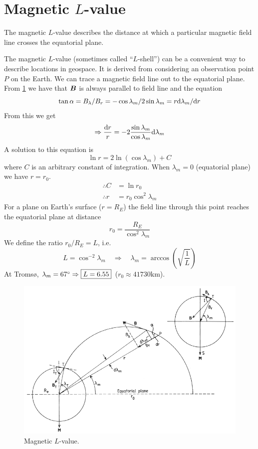 \section{Magnetic \(L\)-value}
\begin{definition}\label{def:mag_L_value}
    The magnetic \(L\)-value describes the distance at which a particular magnetic field line crosses the equatorial plane.
\end{definition}
\noindent The magnetic \(L\)-value (sometimes called ``\(L\)-shell'') can be a convenient way to describe locations in geospace. It is derived from considering an observation point \(P\) on the Earth. We can trace a magnetic field line out to the equatorial plane. From \cref{fig:magnetic_L_value} we have that \(\boldsymbol{B}\) is always parallel to field line and the equation
\begin{equation*}
    \tan\alpha=B_\lambda/B_r=-\cos\lambda_m/2\sin\lambda_m=r\textnormal{d}\lambda_m/\textnormal{d}r
\end{equation*}
From this we get
\begin{equation*}
    \Rightarrow \frac{\textnormal{d}r}{r}=-2\frac{\sin\lambda_m}{\cos\lambda_m}\textnormal{d}\lambda_m
\end{equation*}
A solution to this equation is
\begin{equation*}
    \ln r=2\ln(\cos\lambda_m)+C
\end{equation*}
where \(C\) is an arbitrary constant of integration. When \(\lambda_m=0\) (equatorial plane) we have \(r=r_0\).
\begin{align*}
    \therefore C&=\ln r_0\\
    \therefore r&=r_0\cos^2\lambda_m
\end{align*}
For a plane on Earth’s surface (\(r=R_E\)) the field line through this point reaches the equatorial plane at distance
\begin{equation*}
    r_0=\frac{R_E}{\cos^2\lambda_m}
\end{equation*}
We define the ratio \(r_0/R_E=L\), i.e.\
\begin{equation*}
    L=\cos^{-2}\lambda_m\quad\Rightarrow\quad\lambda_m=\arccos\left(\sqrt{\frac{1}{L}}\right)
\end{equation*}
At Tromsø, \(\lambda_m=67^\circ\Rightarrow \boxed{L=6.55}\) (\(r_0\approx 41730\si{\kilo\metre}\)).

\begin{figure}[t]
    \centering
    \includegraphics[width=.6\linewidth]{bilder/L3_magnetic_L_value.png}
    \caption{Magnetic \(L\)-value.}\label{fig:magnetic_L_value}
\end{figure}


